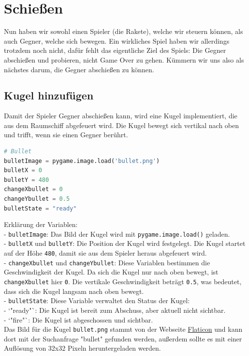 \documentclass{article}
\begin{document}
\pagebreak

\section{Schießen}
Nun haben wir sowohl einen Spieler (die Rakete), welche wir steuern können, als auch Gegner, welche sich bewegen. Ein wirkliches Spiel haben wir allerdings trotzdem noch nicht, dafür fehlt das eigentliche Ziel des Spiels: Die Gegner abschießen und probieren, nicht Game Over zu gehen. Kümmern wir uns also als nächstes darum, die Gegner abschießen zu können.

\subsection{Kugel hinzufügen}
Damit der Spieler Gegner abschießen kann, wird eine Kugel implementiert, die aus dem Raumschiff abgefeuert wird. Die Kugel bewegt sich vertikal nach oben und trifft, wenn sie einen Gegner berührt.

\begin{lstlisting}[style=pythonstyle, language=Python]
# Bullet
bulletImage = pygame.image.load('bullet.png')
bulletX = 0
bulletY = 480
changeXbullet = 0
changeYbullet = 0.5
bulletState = "ready"
\end{lstlisting}

Erklärung der Variablen:\\
- \texttt{bulletImage}: Das Bild der Kugel wird mit \texttt{pygame.image.load()} geladen.\\
- \texttt{bulletX} und \texttt{bulletY}: Die Position der Kugel wird festgelegt. Die Kugel startet auf der Höhe \texttt{480}, damit sie aus dem Spieler heraus abgefeuert wird.\\
- \texttt{changeXbullet} und \texttt{changeYbullet}: Diese Variablen bestimmen die Geschwindigkeit der Kugel. Da sich die Kugel nur nach oben bewegt, ist \texttt{changeXbullet} hier \texttt{0}. Die vertikale Geschwindigkeit beträgt \texttt{0.5}, was bedeutet, dass sich die Kugel langsam nach oben bewegt.\\
- \texttt{bulletState}: Diese Variable verwaltet den Status der Kugel:\\
  - `"ready"`: Die Kugel ist bereit zum Abschuss, aber aktuell nicht sichtbar.\\
  - `"fire"`: Die Kugel ist abgeschossen und sichtbar.\\

Das Bild für die Kugel \texttt{bullet.png} stammt von der Webseite \href{https://www.flaticon.com/}{Flaticon} und kann dort mit der Suchanfrage "bullet" gefunden werden, außerdem sollte es mit einer Auflösung von 32x32 Pixeln heruntergeladen werden.
\end{document}
